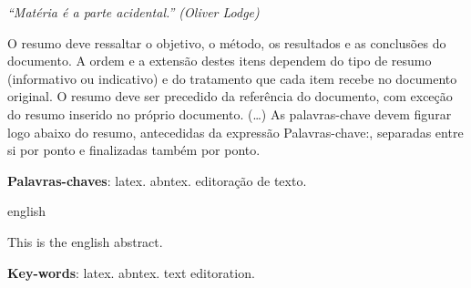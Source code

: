 \documentclass[
	12pt,				%
	openright,			%
	twoside,			%
	a4paper,			%
	english,			%
	brazil				%
	]{abntex2}
\begin{document}
\begin{epigrafe}
    \vspace*{\fill}
	\begin{flushright}
		\textit{``Matéria é a parte acidental.'' (Oliver Lodge)}
	\end{flushright}
\end{epigrafe}


\setlength{\absparsep}{18pt} %
\begin{resumo}
 \noindent O resumo deve ressaltar o objetivo, o método, os resultados e as conclusões do documento. A ordem e a extensão
 destes itens dependem do tipo de resumo (informativo ou indicativo) e do tratamento que cada item recebe no documento original. O resumo deve ser precedido da referência do documento, com exceção do resumo inserido no
 próprio documento. (\ldots) As palavras-chave devem figurar logo abaixo do resumo, antecedidas da expressão Palavras-chave:, separadas entre si por
 ponto e finalizadas também por ponto.

 \textbf{Palavras-chaves}: latex. abntex. editoração de texto.
\end{resumo}

\begin{resumo}[Abstract]
 \begin{otherlanguage*}{english}

\noindent This is the english abstract.

   \vspace{\onelineskip}

   \noindent
   \textbf{Key-words}: latex. abntex. text editoration.
 \end{otherlanguage*}
\end{resumo}

%
%
%
\listoffigures*
\cleardoublepage
\end{document}
